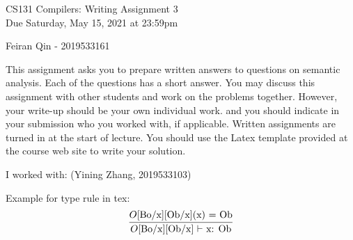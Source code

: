 \documentclass[10pt]{article}
\newcommand{\infertext}[2]{\infer{{\textrm{#1}}}{#2}}
\begin{document}
\begin{center}
\Large CS131 Compilers: Writing Assignment 3\\Due Saturday, May 15, 2021 at 23:59pm
\end{center}

\begin{center}
\LARGE  Feiran Qin - 2019533161
\end{center}

This assignment asks you to prepare written answers to questions on
semantic analysis. Each of the questions has a short answer. You
may discuss this assignment with other students and work on the problems
together. However, your write-up should be your own individual work.
and you should indicate in your submission who you worked with, if applicable.
Written assignments are turned in at the start of lecture.
You should use the Latex template provided at the course web site to write your solution.

\begin{center}
I worked with: (Yining Zhang, 2019533103)
\end{center}

Example for type rule in tex:
\[\infertext
          {$O$[Bo/x][Ob/x] $\vdash$ x: Ob}
          {\textrm{$O$[Bo/x][Ob/x](x) = Ob}}       
\]
\end{document}
